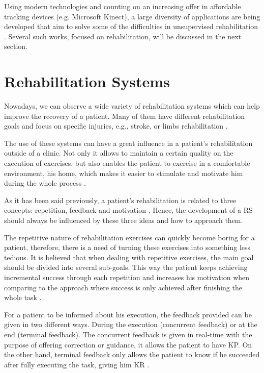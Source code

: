 Using modern technologies and counting on an increasing offer in 
affordable tracking devices (e.g. Microsoft Kinect), a large
diversity of applications are being developed that aim to solve 
some of the difficulties in unsupervised rehabilitation \cite{Kitsunezaki2013,Borghese2013}. Several such works, focused on rehabilitation, will be discussed in the next section.


\section{Rehabilitation Systems}

Nowadays, we can observe a wide variety of rehabilitation systems which can help improve the recovery of a patient. 
Many of them have different rehabilitation goals and focus on specific injuries, e.g., stroke\cite{Borghese2013, Design2005}, 
or limbs rehabilitation \cite{Sadihov2013,Burke2009, Klein2013}.

The use of these systems can have a great influence in a patient's rehabilitation outside of a clinic. 
Not only it allows to maintain a certain quality on the execution of exercises, but also enables 
the patient to exercise in a comfortable environment, his home, which makes it easier to stimulate 
and motivate him during the whole process \cite{Borghese2013}.

As it has been said previously, a patient's rehabilitation is related to three concepts: repetition, feedback and motivation \cite{Schonauer2011a}. 
Hence, the development of a \ac{RS} should always be influenced by these three ideas and how to approach them. 

The repetitive nature of rehabilitation exercises can quickly become boring for a patient\cite{Rego2010, Burke2009, Burdea2002}, 
therefore, there is a need of turning these exercises into something less tedious. 
It is believed that when dealing with repetitive exercises, the main goal should be divided into several sub-goals. This way the 
patient keeps achieving incremental success through each repetition and increases his motivation when comparing to the approach where success is only achieved after finishing the whole task \cite{Schonauer2011a}.

For a patient to be informed about his execution, the feedback provided can be given in two different ways. During the execution
(concurrent feedback) or at the end (terminal feedback)\cite{Sigrist2013}.
The concurrent feedback is given in real-time with the purpose of offering correction or guidance, 
it allows the patient to have \ac{KP}. On the other hand, terminal feedback only allows the patient 
to know if he succeeded after fully executing the task, giving him \ac{KR} \cite{Design2005, Schonauer2011a}. 

